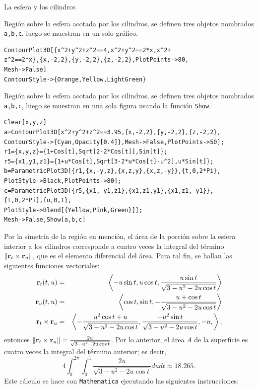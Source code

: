 \begin{parrafonumerado}
\item La esfera y los cilindros

Región sobre la esfera acotada por los cilindros, se definen tres objetos nombrados \verb"a,b,c", luego se muestran en un solo gráfico.

\begin{tcolorbox}[title=\bf Instrucción en \verb"Mathematica"]\begin{Verbatim}[formatcom=\letraverbatim]
ContourPlot3D[{x^2+y^2+z^2==4,x^2+y^2==2*x,x^2+
z^2==2*x},{x,-2,2},{y,-2,2},{z,-2,2},PlotPoints->80,
Mesh->False]
ContourStyle->{Orange,Yellow,LightGreen}
\end{Verbatim}
\end{tcolorbox}

\item Región sobre la esfera acotada por los cilindros, se definen tres objetos nombrados \verb"a,b,c", luego se muestran en una sola figura usando la función \verb"Show".

\begin{tcolorbox}[title=\bf Instrucción en \verb"Mathematica"]\begin{Verbatim}[formatcom=\letraverbatim]
Clear[x,y,z]
a=ContourPlot3D[x^2+y^2+z^2==3.95,{x,-2,2},{y,-2,2},{z,-2,2},
ContourStyle->{Cyan,Opacity[0.4]},Mesh->False,PlotPoints->50];
r1={x,y,z}={1+Cos[t],Sqrt[2-2*Cos[t]],Sin[t]};
r5={x1,y1,z1}={1+u*Cos[t],Sqrt[3-2*u*Cos[t]-u^2],u*Sin[t]};
b=ParametricPlot3D[{r1,{x,-y,z},{x,z,y},{x,z,-y}},{t,0,2*Pi},
PlotStyle->Black,PlotPoints->80];
c=ParametricPlot3D[{r5,{x1,-y1,z1},{x1,z1,y1},{x1,z1,-y1}},
{t,0,2*Pi},{u,0,1},
PlotStyle->Blend[{Yellow,Pink,Green}]];
Mesh->False,Show[a,b,c]
\end{Verbatim}
\end{tcolorbox}

Por la simetría de la región en mención, el área de la porción sobre la esfera interior a los cilindros corresponde a cuatro veces la integral del término
$\left\Vert {\bf r}_{t}\times {\bf r}_{u}\right\Vert$, que es el elemento diferencial del área.
Para tal fin, se hallan las siguientes funciones vectoriales:
\begin{eqnarray*}
{\bf r}_{t}(t,u) &=& \left \langle -u\sin t,u\cos t,\frac{u\sin t}{\sqrt{3-u^2 -2u\cos t}}\right \rangle \\
{\bf r}_{u}(t,u)&=& \left \langle\cos t,\sin t,-\frac{u+\cos t}{\sqrt{3-u^2-2u\cos t}}\right \rangle \\
{\bf r}_{t}\times{\bf r}_{u}&=&\left \langle-\frac{u^2 \cos t+u}{\sqrt{3-u^2 -2u\cos t}},\frac{-u^2 \sin t}{\sqrt{3-u^2 -2u\cos t}},-u,\right \rangle,
\end{eqnarray*}
entonces
$\left\Vert {\bf r}_{t}\times{\bf r}_{u} \right\Vert =\frac{2u}{\sqrt{3-u^{2}-2u\cos t}}$.
Por lo anterior, el área $A$ de la superficie es cuatro veces la integral del término anterior; es decir,
\[4\int_{0}^{2\pi}\int_{0}^{1}\frac{2u}{\sqrt{3-u^{2}-2u\cos t}}dudt \approx 18. 265.\]
Este cálculo se hace con \verb"Mathematica" ejecutando las siguientes instrucciones:


\end{parrafonumerado}
